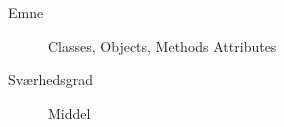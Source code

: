 \begin{description}
\item[Emne] Classes, Objects, Methods Attributes
\item[Sværhedsgrad] Middel
\end{description}
